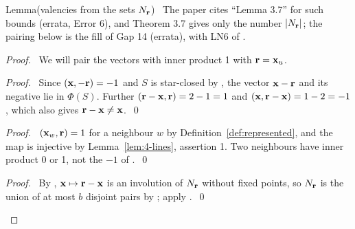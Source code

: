 \begin{namedresult}{Lemma}{(valencies from the sets $N_{\mathbf r}$)}\label{lem:4-valency}
 \repair\ The paper cites ``Lemma 3.7'' for such bounds (errata, Error 6), and Theorem 3.7 gives
 only the number $|N_{\mathbf r}|$; the pairing below is the fill of Gap 14 (errata), with LN6 of
 .
\end{namedresult}
\begin{proof}
 \pfsketch\ We will pair the vectors with inner product 1 with ${\mathbf r}={\mathbf x}_u$.
 \begin{proof}\pf\ Since $({\mathbf x},-{\mathbf r})=-1$ and $S$ is star-closed by , the vector
  ${\mathbf x}-{\mathbf r}$ and its negative lie in $\Phi(S)$. Further $({\mathbf r}-{\mathbf x},{\mathbf r})=2-1=1$ and
  $({\mathbf x},{\mathbf r}-{\mathbf x})=1-2=-1$, which also gives ${\mathbf r}-{\mathbf x}\ne{\mathbf x}$.~\qed\end{proof}
 \begin{proof}\pf\ $({\mathbf x}_w,{\mathbf r})=1$ for a neighbour $w$ by Definition~\ref{def:represented}, and
  the map is injective by Lemma~\ref{lem:4-lines}, assertion 1. Two neighbours have inner product
  0 or 1, not the $-1$ of .~\qed\end{proof}
 \qedstep
 \begin{proof}\pf\ By , ${\mathbf x}\mapsto{\mathbf r}-{\mathbf x}$ is an involution of $N_{\mathbf r}$
  without fixed points, so $N_{\mathbf r}$ is the union of at most $b$ disjoint pairs by
  ; apply .~\qed\end{proof}
\end{proof}

